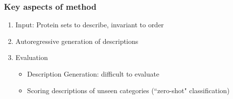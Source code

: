 \documentclass{beamer}
\begin{document}
\begin{frame}
\frametitle{Key aspects of method}
\begin{enumerate}
    \item{Input: Protein sets to describe, invariant to order}\pause
    \item{Autoregressive generation of descriptions}\pause
    \item{Evaluation}\pause
        \begin{itemize}
            \item{Description Generation: difficult to evaluate}\pause
            \item{Scoring descriptions of unseen categories (``zero-shot" classification)}\pause


\end{itemize}
\end{enumerate}
\end{frame}
\end{document}
